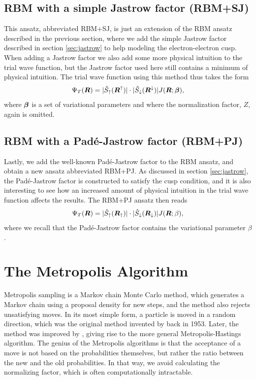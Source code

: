 \subsection{RBM with a simple Jastrow factor (RBM+SJ)} \label{sec:rbmsj}
This ansatz, abbreviated RBM+SJ, is just an extension of the RBM ansatz described in the previous section, where we add the simple Jastrow factor described in section \ref{sec:jastrow} to help modeling the electron-electron cusp. When adding a Jastrow factor we also add some more physical intuition to the trial wave function, but the Jastrow factor used here still contains a minimum of physical intuition. The trial wave function using this method thus takes the form
\begin{equation}
\Psi_T(\boldsymbol{{R}})=|\hat{S}_{\uparrow}(\boldsymbol{{R}}^{\uparrow})|\cdot|\hat{S}_{\downarrow}(\boldsymbol{{R}}^{\downarrow})|J(\boldsymbol{{R}};\boldsymbol{{\beta}}),
\end{equation}
where $\boldsymbol{{\beta}}$ is a set of variational parameters and where the normalization factor, $Z$, again is omitted.  

\subsection{RBM with a Padé-Jastrow factor (RBM+PJ)} \label{sec:rbmpj}
Lastly, we add the well-known Padé-Jastrow factor to the RBM ansatz, and obtain a new ansatz abbreviated RBM+PJ. As discussed in section \ref{sec:jastrow}, the Padé-Jastrow factor is constructed to satisfy the cusp condition, and it is also interesting to see how an increased amount of physical intuition in the trial wave function affects the results. The RBM+PJ ansatz then reads
\begin{equation}
\Psi_T(\boldsymbol{{R}})=|\hat{S}_{\uparrow}(\boldsymbol{{R}}_{\uparrow})|\cdot|\hat{S}_{\downarrow}(\boldsymbol{{R}}_{\downarrow})|J(\boldsymbol{{R}};\beta),
\end{equation}
where we recall that the Padé-Jastrow factor contains the variational parameter $\beta$.

\section{The Metropolis Algorithm} \label{sec:metropolis}
Metropolis sampling is a Markov chain Monte Carlo method, which generates a Markov chain using a proposal density for new steps, and the method also rejects unsatisfying moves. In its most simple form, a particle is moved in a random direction, which was the original method invented by \citet{metropolis_equation_1953} back in 1953. Later, the method was improved by \citet{hastings_monte_1970}, giving rise to the more general Metropolis-Hastings algorithm. The genius of the Metropolis algorithms is that the acceptance of a move is not based on the probabilities themselves, but rather the ratio between the new and the old probabilities. In that way, we avoid calculating the normalizing factor, which is often computationally intractable.

